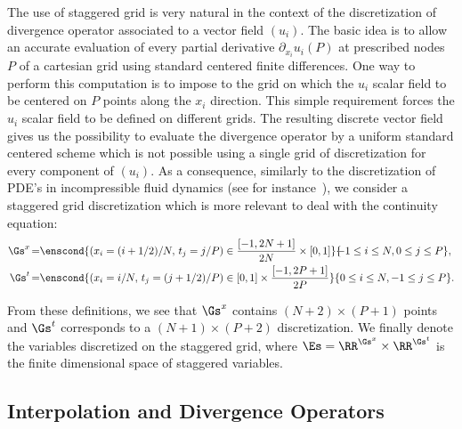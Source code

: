 The use of staggered grid is very natural in the context of the discretization of divergence operator associated to a vector field $(u_i)$. The basic idea is to allow an accurate evaluation of every partial derivative $\partial_{x_i} u_i(P)$ at prescribed nodes  $P$ of a cartesian grid  using standard centered finite differences. One way to perform this computation is to impose to the grid on which the $u_i$ scalar field to be centered on $P$ points along the $x_i$ direction. This simple requirement forces the $u_i$ scalar field to be defined on different grids. The resulting  discrete vector field gives us the possibility to evaluate the divergence operator by a uniform standard centered scheme which is not possible using a single grid of discretization for every component of $(u_i)$. As a consequence, similarly to the discretization of PDE's in incompressible fluid dynamics (see for instance~\cite{Harlow1965}), we consider a staggered grid discretization which is more relevant to deal with the continuity equation:
\begin{align*}
	\Gs^x \hspace{-0.05cm}&=\hspace{-0.1cm} \enscond{ \left(x_{i}=(i+1/2)/N ,\, t_j=j/P\right) \in \frac{[-1,2N+1]}{2N}\times[0,1]} {\hspace{-0.15cm}-1 \leq i \leq  N, 0 \leq j \leq  P },\\
	\Gs^t \hspace{-0.05cm}&=\hspace{-0.1cm} \enscond{ \left(x_i=i/N,\, t_{j}=(j+1/2)/P\right) \in [0,1]\times\frac{[-1,2P+1]}{2P}}{ 0 \leq i \leq  N, -1 \leq j \leq  P }.
\end{align*}

From these definitions, we see that $\Gs^x$ contains $(N+2)\times(P+1)$ points and $\Gs^t$ corresponds to a $(N+1)\times(P+2)$ discretization. We finally denote 
the variables discretized on the staggered grid, where $\Es = \RR^{\Gs^x} \times \RR^{\Gs^t}$ is the finite dimensional space of staggered variables. 


\subsection{Interpolation  and Divergence Operators}

